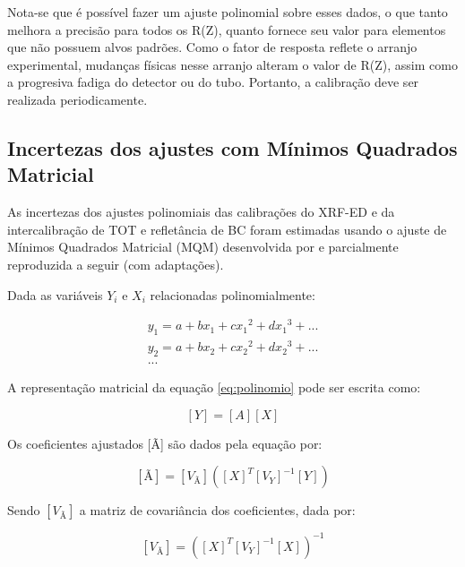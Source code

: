 Nota-se que é possível fazer um ajuste polinomial sobre esses dados, 
o que tanto melhora a precisão para todos os R(Z), quanto fornece seu valor
para elementos que não possuem alvos padrões. Como o fator de resposta reflete 
o arranjo experimental, mudanças físicas
nesse arranjo alteram o valor de R(Z), assim como a progresiva fadiga do detector
ou do tubo. Portanto, a calibração deve ser realizada periodicamente.

\subsection{Incertezas dos ajustes com Mínimos Quadrados Matricial}

As incertezas dos ajustes polinomiais das calibrações do XRF-ED e da 
intercalibração de TOT e refletância de BC foram estimadas usando o ajuste de 
Mínimos Quadrados Matricial (MQM) desenvolvida por \citet{helene2006}
e parcialmente reproduzida a seguir (com adaptações).

Dada as variáveis $Y_i$ e $X_i$ relacionadas polinomialmente:

\begin{equation}
  \label{eq:polinomio}
  \begin{split}
    y_1 = a + b x_1 + c{x_1}^2 + d{x_1}^3 + ...\\
    y_2 = a + b x_2 + c{x_2}^2 + d{x_2}^3 + ... \\
    ...
  \end{split}
\end{equation}

A representação matricial da equação \ref{eq:polinomio} pode ser escrita como:

\begin{equation}
  \label{eq:polinomioMatriz}
  [Y] = [A][X]
\end{equation}

Os coeficientes ajustados [Ã] são dados pela equação por:

\begin{equation}
  \label{eq:coeficientesajustados}
  [Ã] = [V_{Ã}] ([X]^T {[V_Y]}^{-1} [Y])
\end{equation}

Sendo $[V_{Ã}]$ a matriz de covariância dos coeficientes, dada por:

\begin{equation}
  \label{eq:matrizcovariancia}
  [V_{Ã}] = ([X]^T [V_Y]^{-1} [X])^{-1}
\end{equation}


